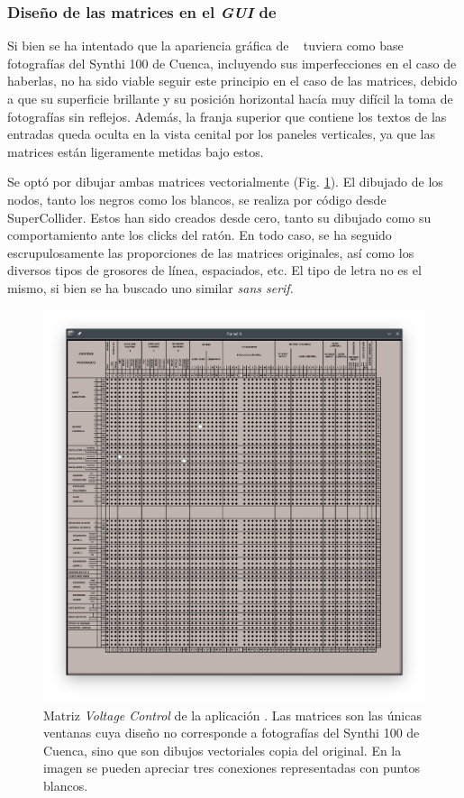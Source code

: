 \subsubsection[Diseño de las matrices en el \textit{GUI} de  \appName]{Diseño de las matrices en el \textit{GUI} de  \appName}
Si bien se ha intentado que la apariencia gráfica de \appName~ tuviera como base fotografías del Synthi 100 de Cuenca, incluyendo sus imperfecciones en el caso de haberlas, no ha sido viable seguir este principio en el caso de las matrices, debido a que su superficie brillante y su posición horizontal hacía muy difícil la toma de fotografías sin reflejos. Además, la franja superior que contiene los textos de las entradas queda oculta en la vista cenital por los paneles verticales, ya que las matrices están ligeramente metidas bajo estos.

Se optó por dibujar ambas matrices vectorialmente (Fig. \ref{fig:matriz_control_synthigme}). El dibujado de los nodos, tanto los negros como los blancos, se realiza por código desde SuperCollider. Estos han sido creados desde cero, tanto su dibujado como su comportamiento ante los clicks del ratón. En todo caso, se ha seguido escrupulosamente las proporciones de las matrices originales, así como los diversos tipos de grosores de línea, espaciados, etc.  El tipo de letra no es el mismo, si bien se ha buscado uno similar \textit{sans serif}.

\begin{figure}
	\centering
	\includegraphics[width=1\textwidth]{images/matriz_control_synthigme}
	\caption[Matriz \textit{Voltage Control} de la aplicación \appName]{Matriz \textit{Voltage Control} de la aplicación \appName. Las matrices son las únicas ventanas cuya diseño no corresponde a fotografías del Synthi 100 de Cuenca, sino que son dibujos vectoriales copia del original. En la imagen se pueden apreciar tres conexiones representadas con puntos blancos.}
	\label{fig:matriz_control_synthigme}
\end{figure}

